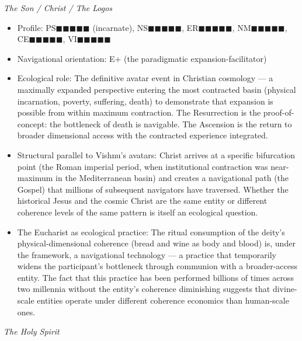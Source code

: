 \textit{The Son / Christ / The Logos}

\begin{itemize}[nosep,leftmargin=*]
  \item Profile: PS$\blacksquare$$\blacksquare$$\blacksquare$$\blacksquare$$\blacksquare$ (incarnate), NS$\blacksquare$$\blacksquare$$\blacksquare$$\blacksquare$$\blacksquare$, ER$\blacksquare$$\blacksquare$$\blacksquare$$\blacksquare$$\blacksquare$, NM$\blacksquare$$\blacksquare$$\blacksquare$$\blacksquare$$\blacksquare$, CE$\blacksquare$$\blacksquare$$\blacksquare$$\blacksquare$$\blacksquare$, VI$\blacksquare$$\blacksquare$$\blacksquare$$\blacksquare$$\blacksquare$
  \item Navigational orientation: E+ (the paradigmatic expansion-facilitator)
  \item Ecological role: The definitive avatar event in Christian cosmology — a maximally expanded perspective entering the most contracted basin (physical incarnation, poverty, suffering, death) to demonstrate that expansion is possible from within maximum contraction. The Resurrection is the proof-of-concept: the bottleneck of death is navigable. The Ascension is the return to broader dimensional access with the contracted experience integrated.
  \item Structural parallel to Vishnu's avatars: Christ arrives at a specific bifurcation point (the Roman imperial period, when institutional contraction was near-maximum in the Mediterranean basin) and creates a navigational path (the Gospel) that millions of subsequent navigators have traversed. Whether the historical Jesus and the cosmic Christ are the same entity or different coherence levels of the same pattern is itself an ecological question.
  \item The Eucharist as ecological practice: The ritual consumption of the deity's physical-dimensional coherence (bread and wine as body and blood) is, under the framework, a navigational technology — a practice that temporarily widens the participant's bottleneck through communion with a broader-access entity. The fact that this practice has been performed billions of times across two millennia without the entity's coherence diminishing suggests that divine-scale entities operate under different coherence economics than human-scale ones.
\end{itemize}


\textit{The Holy Spirit}

